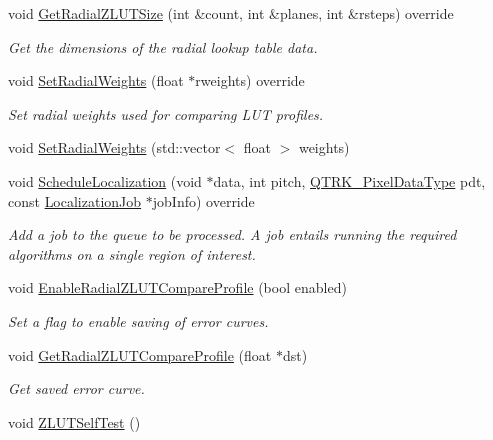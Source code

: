 \begin{DoxyCompactItemize}
void \hyperlink{class_queued_c_p_u_tracker_a57c77fc0ceada2aeffc018970d9d18d8}{Get\+Radial\+Z\+L\+U\+T\+Size} (int \&count, int \&planes, int \&rsteps) override
\begin{DoxyCompactList}\small\item\em Get the dimensions of the radial lookup table data. \end{DoxyCompactList}\item 
void \hyperlink{class_queued_c_p_u_tracker_a070149d1ecf38176ae2cc84a71f3851f}{Set\+Radial\+Weights} (float $\ast$rweights) override
\begin{DoxyCompactList}\small\item\em Set radial weights used for comparing L\+UT profiles. \end{DoxyCompactList}\item 
void \hyperlink{class_queued_c_p_u_tracker_ab16da04344186411198d646df47f1218}{Set\+Radial\+Weights} (std\+::vector$<$ float $>$ weights)
\item 
void \hyperlink{class_queued_c_p_u_tracker_aefc2afb79c4347dbbbd66d84cfd8787f}{Schedule\+Localization} (void $\ast$data, int pitch, \hyperlink{qtrk__c__api_8h_aad82367b3ea592a142bb50a2fb538b0b}{Q\+T\+R\+K\+\_\+\+Pixel\+Data\+Type} pdt, const \hyperlink{struct_localization_job}{Localization\+Job} $\ast$job\+Info) override
\begin{DoxyCompactList}\small\item\em Add a job to the queue to be processed. A job entails running the required algorithms on a single region of interest. \end{DoxyCompactList}\item 
void \hyperlink{class_queued_c_p_u_tracker_accb203fae1a724f6ac870c4dc402dda7}{Enable\+Radial\+Z\+L\+U\+T\+Compare\+Profile} (bool enabled)
\begin{DoxyCompactList}\small\item\em Set a flag to enable saving of error curves. \end{DoxyCompactList}\item 
void \hyperlink{class_queued_c_p_u_tracker_afdc97ea9b0e7eba6d2678a0536c39c37}{Get\+Radial\+Z\+L\+U\+T\+Compare\+Profile} (float $\ast$dst)
\begin{DoxyCompactList}\small\item\em Get saved error curve. \end{DoxyCompactList}\item 
void \hyperlink{class_queued_c_p_u_tracker_adc3feb62a374abea02f4f9502c08c42c}{Z\+L\+U\+T\+Self\+Test} ()

\end{DoxyCompactItemize}
